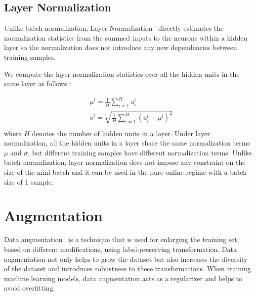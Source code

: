 \subsection{Layer Normalization}

Unlike batch normalization, Layer Normalization~\cite{ba2016layer} directly estimates the normalization statistics from the summed inputs to the neurons within a hidden layer so the normalization does not introduce any new dependencies between training samples.

We compute the layer normalization statistics over all the hidden units in the same layer as follows \cite{ba2016layer}:

\begin{equation}
\begin{split}
    & \mu^{l} = \frac{1}{H}\sum^{H}_{i=1}a_{i}^{l}\\
    &  \sigma^{l} = \sqrt{\frac{1}{H}\sum^{H}_{i=1}\left(a_{i}^{l}-\mu^{l}\right)^{2}} \\
\end{split}
\end{equation}
where $H$ denotes the number of hidden units in a layer. Under layer normalization, all the hidden units in a layer share the same normalization terms $\mu$ and $\sigma$, but different training samples have different normalization terms. Unlike batch normalization, layer normalization does not impose any constraint on the size of the mini-batch and it can be used in the pure online regime with a batch size of 1 sample.

\section{Augmentation}
Data augmentation~\cite{balestriero2022effects} is a technique that is used for enlarging the training set, based on different modifications, using label-preserving transformation. Data augmentation not only helps to grow the dataset but also increases the diversity of the dataset and introduces robustness to these transformations. When training machine learning models, data augmentation acts as a regularizer and helps to avoid overfitting.

